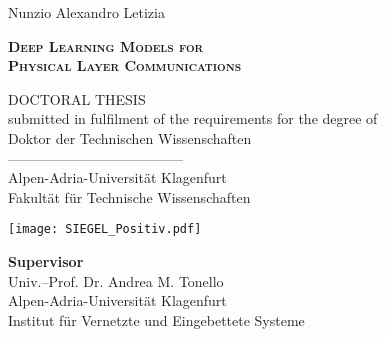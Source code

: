 
\begin{titlepage}

\begin{center}

	{\LARGE Nunzio Alexandro Letizia}\\
	\vspace{3.5mm}
	
	\begin{spacing}{2}
	{ \Huge \textbf{\textsc{Deep Learning Models for}}}\\
	{ \Huge \textbf{\textsc{Physical Layer Communications}}}\\
	\end{spacing}
	\vspace{3.5mm}
	
	{\LARGE \textsc{DOCTORAL THESIS}} \\

submitted in fulfilment of the requirements for the degree of \\
Doktor der Technischen Wissenschaften\\
	-------------------------------------- \\
Alpen-Adria-Universit{\"a}t Klagenfurt\\
Fakult{\"a}t f{\"u}r Technische Wissenschaften\\
  
\vspace{3mm}
\end{center}
	\begin{center}
			\texttt{[image: SIEGEL\_Positiv.pdf]}			
	\end{center}

\begin{multicols}{2}
    \noindent \large{\textbf{Supervisor}}\\
    \noindent Univ.--Prof. Dr. Andrea M. Tonello\\
    \noindent \normalsize{Alpen-Adria-Universit{\"a}t Klagenfurt}\\
    \noindent \normalsize{Institut f{\"u}r Vernetzte und Eingebettete Systeme}\\


\end{multicols}
\end{titlepage}
